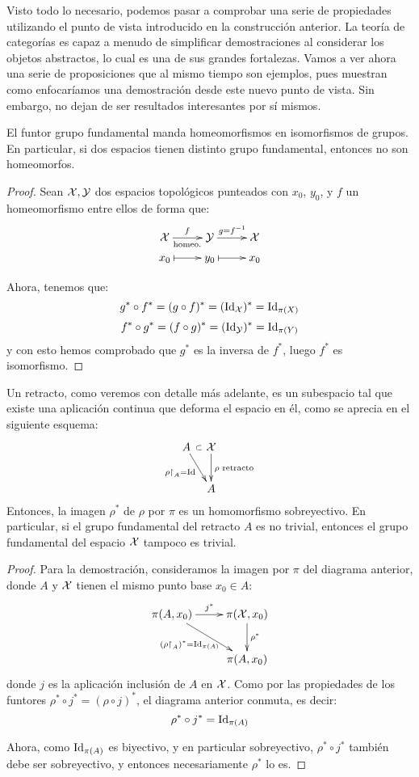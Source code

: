 Visto todo lo necesario, podemos pasar a comprobar una serie de propiedades utilizando el punto de vista introducido en la construcción anterior. La teoría de categorías es capaz a menudo de simplificar demostraciones al considerar los objetos abstractos, lo cual es una de sus grandes fortalezas. Vamos a ver ahora una serie de proposiciones que al mismo tiempo son ejemplos, pues muestran como enfocaríamos una demostración desde este nuevo punto de vista. Sin embargo, no dejan de ser resultados interesantes por sí mismos.

\begin{prop}
	El funtor grupo fundamental manda homeomorfismos en isomorfismos de grupos. En particular, si dos espacios tienen distinto grupo fundamental, entonces no son homeomorfos.
	
	\begin{proof}
		Sean $\mathcal{X},\mathcal{Y}$ dos espacios topológicos punteados con $x_0$, $y_0$, y $f$ un homeomorfismo entre ellos de forma que:
		\[\xymatrix @R=0.4pc {
			\X \ar[r]^f_{\text{homeo.}} & \Y \ar[r]^{g=f^{-1}} & \X \\
			x_0 \ar@{|->}[r] & y_0 \ar@{|->}[r] & x_0
		}\]
		
		Ahora, tenemos que:
		\[g^\ast\circ f^\ast = (g\circ f)^\ast = (\operatorname{Id}_{\mathcal{X}})^\ast = \operatorname{Id}_{\pi(X)}\]
		\[f^\ast\circ g^\ast = (f\circ g)^\ast = (\operatorname{Id}_{\mathcal{Y}})^\ast = \operatorname{Id}_{\pi(Y)}\]
		y con esto hemos comprobado que $g^\ast$ es la inversa de $f^\ast$, luego $f^\ast$ es isomorfismo.
	\end{proof}
\end{prop}

\begin{prop}
	Un retracto, como veremos con detalle más adelante, es un subespacio tal que existe una aplicación continua que deforma el espacio en él, como se aprecia en el siguiente esquema:
	\[\xymatrix @C=0.65pc {
		A \ar@{}[r]|\subset \ar[dr]_{\rho\restriction_A = \Id} & \X \ar[d]^{\rho\text{ retracto}} \\
		& A
	}\]
	Entonces, la imagen $\rho^\ast$ de $\rho$ por $\pi$ es un homomorfismo sobreyectivo. En particular, si el grupo fundamental del retracto $A$ es no trivial, entonces el grupo fundamental del espacio $\mathcal{X}$ tampoco es trivial.
	
	\begin{proof}
		Para la demostración, consideramos la imagen por $\pi$ del diagrama anterior, donde $A$ y $\mathcal{X}$ tienen el mismo punto base $x_0\in A$:
		\[\xymatrix {
			\pi(A,x_0) \ar[r]^{j^\ast} \ar[dr]_{(\rho\restriction_A)^\ast = \Id_{\pi(A)}} & \pi(\X,x_0) \ar[d]^{\rho^\ast} \\
			& \pi(A,x_0)
		}\]
		donde $j$ es la aplicación inclusión de $A$ en $\mathcal{X}$. Como por las propiedades de los funtores $\rho^\ast\circ j^\ast=(\rho\circ j)^\ast$, el diagrama anterior conmuta, es decir:
		\[\rho^\ast\circ j^\ast=\operatorname{Id}_{\pi(A)}\]
		
		Ahora, como $\operatorname{Id}_{\pi(A)}$ es biyectivo, y en particular sobreyectivo, $\rho^\ast\circ j^\ast$ también debe ser sobreyectivo, y entonces necesariamente $\rho^\ast$ lo es.
	\end{proof}
\end{prop}

